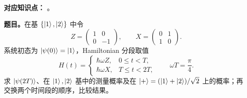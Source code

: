 
\textbf{对应知识点：}
。

\textbf{题目。}在基 $\{\left|1\right\rangle,\left|2\right\rangle\}$ 中令
\begin{equation}
  Z=\begin{pmatrix}1&0\\0&-1\end{pmatrix},
  \qquad
  X=\begin{pmatrix}0&1\\1&0\end{pmatrix}.
  \label{eq:QM-C04-S03-E03-pauli-matrices}
\end{equation}
系统初态为 $\left|\psi(0)\right\rangle=\left|1\right\rangle$，Hamiltonian 分段取值
\begin{equation}
  H(t)=
  \begin{cases}
    \hbar\omega Z,&0\le t<T,\\
    \hbar\omega X,&T\le t<2T,
  \end{cases}
  \qquad \omega T=\frac{\pi}{4}.
  \label{eq:QM-C04-S03-E03-piecewise-hamiltonian}
\end{equation}
求 $\left|\psi(2T)\right\rangle$、在 $\left|1\right\rangle,\left|2\right\rangle$ 基中的测量概率及在 $\left|+\right\rangle=(\left|1\right\rangle+\left|2\right\rangle)/\sqrt2$ 上的概率；再交换两个时间段的顺序，比较结果。

